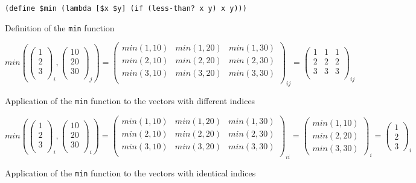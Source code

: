 \documentclass[acmlarge]{acmart}
\begin{document}
\begin{figure}[t]
  \begin{center}
  {\footnotesize
\verb|(define $min (lambda [$x $y] (if (less-than? x y) x y)))|
  }
  \end{center}
  \caption{Definition of the \texttt{min} function}
  \label{fig:minFunction}
  \medskip
  {\small
    $min(\begin{pmatrix} 1 \\ 2 \\ 3 \\ \end{pmatrix}_{i},  \begin{pmatrix} 10 \\ 20 \\ 30 \\ \end{pmatrix}_{j}) = \begin{pmatrix} min(1,10) & min(1,20) & min(1,30) \\ min(2,10) & min(2,20) & min(2,30) \\ min(3,10) & min(3,20) & min(3,30) \\ \end{pmatrix}_{ij}
    = \begin{pmatrix} 1 & 1 & 1 \\ 2 & 2 & 2 \\ 3 & 3 & 3 \\ \end{pmatrix}_{ij}$
    }
  \caption{Application of the \texttt{min} function to the vectors with different indices}
  \label{fig:minDiff}
  \medskip
  {\small
    $min(\begin{pmatrix} 1 \\ 2 \\ 3 \\ \end{pmatrix}_{i},  \begin{pmatrix} 10 \\ 20 \\ 30 \\ \end{pmatrix}_{i}) = \begin{pmatrix} min(1,10) & min(1,20) & min(1,30) \\ min(2,10) & min(2,20) & min(2,30) \\ min(3,10) & min(3,20) & min(3,30) \\ \end{pmatrix}_{ii}
  = \begin{pmatrix} min(1,10) \\ min(2,20) \\ min(3,30) \end{pmatrix}_{i} = \begin{pmatrix} 1 \\ 2 \\ 3 \end{pmatrix}_{i}$ 
    }
  \caption{Application of the \texttt{min} function to the vectors with identical indices}
  \label{fig:minSame}
\end{figure}
\end{document}

